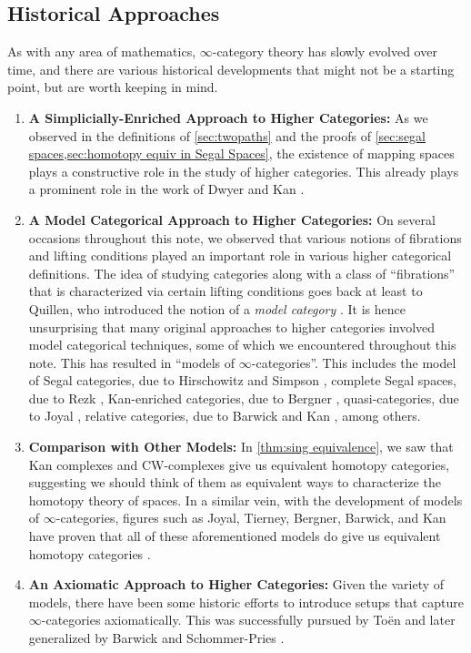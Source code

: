 \documentclass[11pt, a4paper]{amsart}
\theoremstyle{definition}
\theoremstyle{remark}
\numberwithin{equation}{section}
\begin{document}
\subsection{Historical Approaches}
As with any area of mathematics, $\infty$-category theory has slowly evolved over time, and there are various historical developments that might not be a starting point, but are worth keeping in mind.
\begin{enumerate}[leftmargin=*]
    \item \textbf{A Simplicially-Enriched Approach to Higher Categories:} As we observed in the definitions of \cref{sec:twopaths} and the proofs of \cref{sec:segal spaces,sec:homotopy equiv in Segal Spaces}, the existence of mapping spaces plays a constructive role in the study of higher categories. This already plays a prominent role in the work of Dwyer and Kan \cite{dwyerkan1980simplocalization,dwyerkan1980calculatingsimplocalizations}.  
    \item \textbf{A Model Categorical Approach to Higher Categories:} On several occasions throughout this note, we observed that various notions of fibrations and lifting conditions played an important role in various higher categorical definitions. The idea of studying categories along with a class of ``fibrations'' that is characterized via certain lifting conditions goes back at least to Quillen, who introduced the notion of a \emph{model category} \cite{quillen1967modelcats}. It is hence unsurprising that many original approaches to higher categories involved model categorical techniques, some of which we encountered throughout this note. This has resulted in ``models of $\infty$-categories''. This includes the model of Segal categories, due to Hirschowitz and Simpson \cite{hirschowitzsimpson1998segalcat}, complete Segal spaces, due to Rezk \cite{rezk2001css}, Kan-enriched categories, due to Bergner \cite{bergner2007bergnermodelcat}, quasi-categories, due to Joyal \cite{joyal2008notes,joyal2008theory}, relative categories, due to Barwick and Kan \cite{barwickkan2012relativecategory}, among others.
    \item \textbf{Comparison with Other Models:} In \cref{thm:sing equivalence}, we saw that Kan complexes and CW-complexes give us equivalent homotopy categories, suggesting we should think of them as equivalent ways to characterize the homotopy theory of spaces. In a similar vein, with the development of models of $\infty$-categories, figures such as Joyal, Tierney, Bergner, Barwick, and Kan have proven that all of these aforementioned models do give us equivalent homotopy categories \cite{joyaltierney2007qcatvssegal,bergner2007threemodels,bergner2010survey,barwickkan2012relativecategory,bergner2018book}.
    \item \textbf{An Axiomatic Approach to Higher Categories:} Given the variety of models, there have been some historic efforts to introduce setups that capture $\infty$-categories axiomatically. This was successfully pursued by Toën \cite{toen2005unicity} and later generalized by Barwick and Schommer-Pries \cite{barwickschommerpries2021unicity}.
\end{enumerate}
\end{document}

